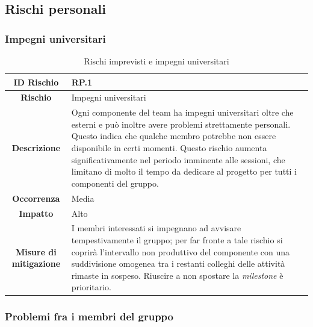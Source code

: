 \documentclass[10pt, a4paper]{article}
\begin{document}
\subsection{Rischi personali}


\subsubsection{Impegni universitari}
{\renewcommand{\arraystretch}{1.5}
\begin{table}[H]
\begin{tabularx}{\textwidth}{c|X}
\textbf{ID Rischio} & RP.1 \\
\hline
\textbf{Rischio} & Impegni universitari\\
\hline
\textbf{Descrizione} & Ogni componente del team ha impegni universitari oltre che esterni e può inoltre avere problemi strettamente personali. Questo indica che qualche membro potrebbe non essere disponibile in certi momenti. Questo rischio aumenta significativamente nel periodo imminente alle sessioni, che limitano di molto il tempo da dedicare al progetto per tutti i componenti del gruppo. \\
\hline
\textbf{Occorrenza} & Media\\
\hline
\textbf{Impatto} & Alto\\
\hline
\textbf{Misure di mitigazione} & I membri interessati si impegnano ad avvisare tempestivamente il gruppo; per far fronte a tale rischio si coprirà l’intervallo non produttivo del componente con una suddivisione omogenea tra i restanti colleghi delle attività rimaste in sospeso.
Riuscire a non spostare la \textit{milestone} è prioritario.\\
\end{tabularx}
\caption{Rischi imprevisti e impegni universitari}
\end{table}}




\subsubsection{Problemi fra i membri del gruppo}
\end{document}
